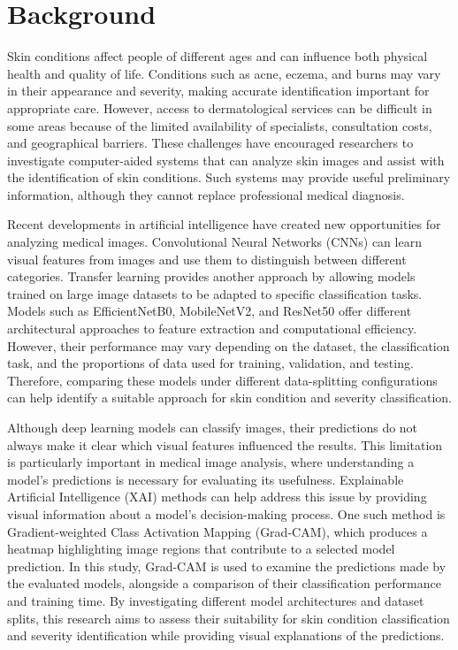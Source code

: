 \section{Background} 
Skin conditions affect people of different ages and can influence both physical health and quality of life. Conditions such as acne, eczema, and burns may vary in their appearance and severity, making accurate identification important for appropriate care. However, access to dermatological services can be difficult in some areas because of the limited availability of specialists, consultation costs, and geographical barriers. These challenges have encouraged researchers to investigate computer-aided systems that can analyze skin images and assist with the identification of skin conditions. Such systems may provide useful preliminary information, although they cannot replace professional medical diagnosis.

Recent developments in artificial intelligence have created new opportunities for analyzing medical images. Convolutional Neural Networks (CNNs) can learn visual features from images and use them to distinguish between different categories. Transfer learning provides another approach by allowing models trained on large image datasets to be adapted to specific classification tasks. Models such as EfficientNetB0, MobileNetV2, and ResNet50 offer different architectural approaches to feature extraction and computational efficiency. However, their performance may vary depending on the dataset, the classification task, and the proportions of data used for training, validation, and testing. Therefore, comparing these models under different data-splitting configurations can help identify a suitable approach for skin condition and severity classification.

Although deep learning models can classify images, their predictions do not always make it clear which visual features influenced the results. This limitation is particularly important in medical image analysis, where understanding a model's predictions is necessary for evaluating its usefulness. Explainable Artificial Intelligence (XAI) methods can help address this issue by providing visual information about a model's decision-making process. One such method is Gradient-weighted Class Activation Mapping (Grad-CAM), which produces a heatmap highlighting image regions that contribute to a selected model prediction. In this study, Grad-CAM is used to examine the predictions made by the evaluated models, alongside a comparison of their classification performance and training time. By investigating different model architectures and dataset splits, this research aims to assess their suitability for skin condition classification and severity identification while providing visual explanations of the predictions.

